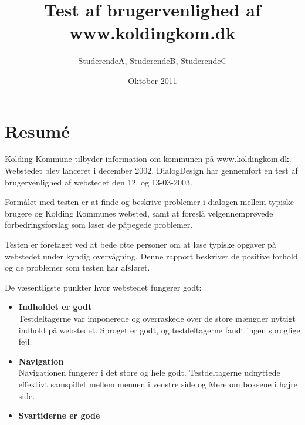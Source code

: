 \documentclass[10pt,a4paper]{article}      %
\author{StuderendeA, StuderendeB, StuderendeC}
\title{Test af brugervenlighed af www.koldingkom.dk}
\date{Oktober 2011}
\begin{document}
\hfuzz=50pt
\maketitle
\newpage

\pagestyle{fancy}
\chead{}
\cfoot{}
\renewcommand{\headrulewidth}{0.4pt}
\renewcommand{\footrulewidth}{0.4pt}

\section*{Resumé}
\setcounter{page}{1} %
\noindent Kolding Kommune tilbyder information om kommunen på www.koldingkom.dk. Webstedet blev lanceret i december 2002. DialogDesign  har gennemført en test af brugervenlighed af webstedet den 12. og 13-03-2003.\newline

\noindent Formålet med testen er at finde og beskrive problemer i dialogen mellem typiske brugere og Kolding Kommunes websted, samt at foreslå velgennemprøvede forbedringsforslag som løser de påpegede problemer.\newline

\noindent Testen er foretaget ved at bede otte personer om at løse typiske opgaver på webstedet under kyndig overvågning. Denne rapport beskriver de positive forhold og de problemer som testen har afsløret.\newline

\noindent De væsentligste punkter hvor webstedet fungerer godt:
\begin{itemize}
  \item \textbf{Indholdet er godt}\\ Testdeltagerne var imponerede og overraskede over de store mængder nyttigt indhold på webstedet. Sproget er godt, og testdeltagerne fandt ingen sproglige fejl.
  \item \textbf{Navigation}\\ Navigationen fungerer i det store og hele godt. Testdeltagerne udnyttede effektivt samspillet mellem menuen i venstre side og Mere om boksene i højre side.
  \item \textbf{Svartiderne er gode}
\end{itemize}
\end{document}
